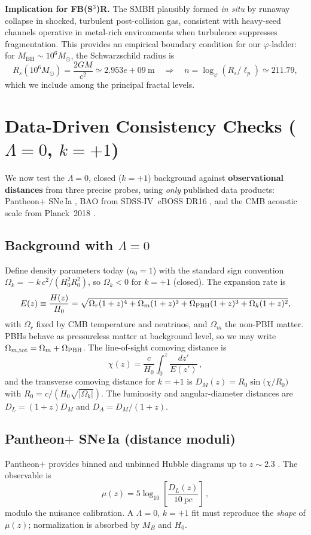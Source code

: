\documentclass[aps,prd,reprint,onecolumn,nofootinbib]{revtex4-2}
\begin{document}
\noindent\textbf{Implication for FB(S$^3$)R.} The SMBH plausibly formed \emph{in situ} by runaway collapse in shocked, turbulent post-collision gas, consistent with heavy-seed channels operative in metal-rich environments when turbulence suppresses fragmentation. This provides an empirical boundary condition for our $\varphi$-ladder: for $M_\mathrm{BH}\sim 10^6M_\odot$, the Schwarzschild radius is
\begin{equation}
R_s(10^6 M_\odot) = \frac{2GM}{c^2} \simeq 2.953e+09\ \mathrm{m} \quad\Rightarrow\quad n=\log_\varphi(R_s/\ell_p)\simeq 211.79,
\end{equation}
which we include among the principal fractal levels.

\section{Data-Driven Consistency Checks ($\Lambda=0$, $k=+1$)}
We now test the $\Lambda=0$, closed ($k=+1$) background against \textbf{observational distances} from three precise probes, using \emph{only} published data products: Pantheon$+$ SNe\,Ia \cite{PantheonPlus2022}, BAO from SDSS-IV~eBOSS DR16 \cite{eBOSS_DR16}, and the CMB acoustic scale from Planck~2018 \cite{Planck2018}.

\subsection{Background with $\Lambda=0$}
Define density parameters today ($a_0\!=\!1$) with the standard sign convention $\Omega_k\!=\!-k\,c^2/(H_0^2 R_0^2)$, so $\Omega_k<0$ for $k=+1$ (closed). The expansion rate is
\begin{equation}
E(z)\equiv \frac{H(z)}{H_0}=\sqrt{\Omega_r(1+z)^4+\Omega_m(1+z)^3+\Omega_{\rm PBH}(1+z)^3+\Omega_k(1+z)^2},
\end{equation}
with $\Omega_r$ fixed by CMB temperature and neutrinos, and $\Omega_m$ the non-PBH matter. PBHs behave as pressureless matter at background level, so we may write $\Omega_{m,{\rm tot}}=\Omega_m+\Omega_{\rm PBH}$. The line-of-sight comoving distance is
\begin{equation}
\chi(z)=\frac{c}{H_0}\int_0^z \frac{dz'}{E(z')}\,,
\end{equation}
and the transverse comoving distance for $k=+1$ is $D_M(z)=R_0 \sin\!\big(\chi/R_0\big)$ with $R_0=c/(H_0\sqrt{|\Omega_k|})$. The luminosity and angular-diameter distances are $D_L=(1+z)D_M$ and $D_A=D_M/(1+z)$.

\subsection{Pantheon$+$ SNe\,Ia (distance moduli)}
Pantheon$+$ provides binned and unbinned Hubble diagrams up to $z\!\sim\!2.3$ \cite{PantheonPlus2022}. The observable is
\begin{equation}
\mu(z)=5\log_{10}\!\left[\frac{D_L(z)}{\mathrm{10~pc}}\right]\,,
\end{equation}
modulo the nuisance calibration. A $\Lambda=0$, $k=+1$ fit must reproduce the \emph{shape} of $\mu(z)$; normalization is absorbed by $M_B$ and $H_0$.
\end{document}
